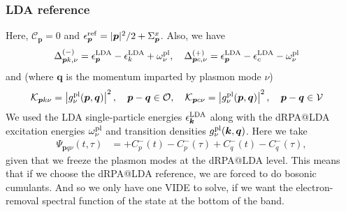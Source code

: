\subsubsection{LDA reference}
 Here, $\mathcal{C}_{\bm{p}}=0$ and $\epsilon_{\bm{p}}^{\rm ref}=|\bm{p}|^2/2 + \Sigma_{\bm{p}}^x$. Also, we have
\begin{align}
\Delta_{\bm{p}k,\nu}^{(-)}
&=
\epsilon_{\bm{p}}^{\rm LDA}
-\epsilon_k^{\rm LDA}
+
\omega_{\nu}^{\rm pl}
, \quad
\Delta_{\bm{p}c,\nu}^{(+)}
=
\epsilon_{\bm{p}}^{\rm LDA}
-\epsilon_c^{\rm LDA}
-
\omega_{\nu}^{\rm pl}
\end{align}
and (where $\bm{q}$ is the momentum imparted by plasmon mode $\nu$)
\begin{align}
\mathcal{K}_{\bm{p}k\nu}
&=
\left|g_\nu^{\rm pl}(\bm{p},\bm{q})\right|^2, \quad \bm{p}-\bm{q}\in\mathcal{O}
,\quad 
\mathcal{K}_{\bm{p}c\nu}
=
\left|g_\nu^{\rm pl}(\bm{p},\bm{q})\right|^2, \quad \bm{p}-\bm{q}\in\mathcal{V}
\end{align}
We used the LDA single-particle energies $\epsilon_{\bm{k}}^{\rm LDA}$ along with the dRPA@LDA excitation energies $\omega_{\nu}^{\rm pl}$ and transition densities $g_\nu^{\rm pl}(\bm{k},\bm{q})$.
Here we take 
\begin{align}
\Psi_{\bm{p}q\nu}(t,\tau)
&=
+C_p^{-}(t)
-C_p^{-}(\tau)
+C_q^{-}(t)
-C_q^{-}(\tau),
\end{align}
given that we freeze the plasmon modes at the dRPA@LDA level. This means that if we choose the dRPA@LDA reference, we are forced to do bosonic cumulants. And so we only have one VIDE to solve, if we want the electron-removal spectral function of the state at the bottom of the band.
